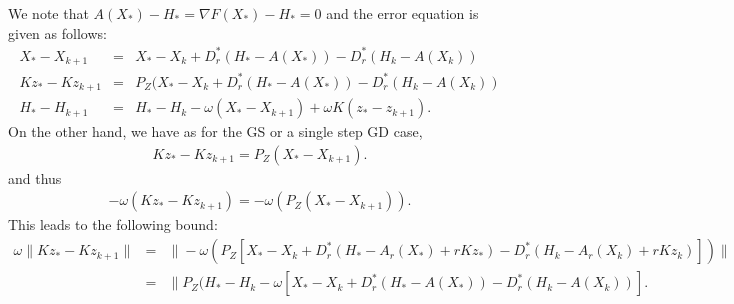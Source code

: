 \begin{itemize}
We note that $A(X_*) - H_* = \nabla F(X_*) - H_* = 0$ and the 
error equation is given as follows:  
\begin{eqnarray*}
X_{*} - X_{k+1} &=& X_* - X_{k} + D_r^*(H_* - A(X_*)) - D_r^* (H_k - A(X_k)) \\ 
Kz_* - Kz_{k+1} &=& P_Z (X_{*} - X_{k} + D_r^*(H_* - A(X_*)) - D_r^* (H_k - A(X_k)) \\ 
H_* - H_{k+1} &=& H_* - H_k - \omega (X_* - X_{k+1}) + \omega K(z_* - z_{k+1}). 
\end{eqnarray*}
On the other hand, we have as for the GS or a single step GD case,
\begin{eqnarray*}
Kz_{*} - Kz_{k+1} = P_Z \left ( X_* - X_{k+1} \right ). 
\end{eqnarray*}
and thus
\begin{eqnarray*}
-\omega \left ( Kz_{*} - Kz_{k+1} \right ) = -\omega \left ( P_Z \left ( X_* - X_{k+1} \right ) \right ). 
\end{eqnarray*}
This leads to the following bound:  
\begin{eqnarray*}
\omega \|Kz_{*} - Kz_{k+1}\| &=& \|-\omega \left ( P_Z [X_* - X_k + D_r^{*} (H_* - A_r(X_*) + rKz_*) - D_r^* (H_k - A_r(X_k) + rKz_k)] \right ) \| \\
&=& \|P_Z (H_* - H_k - \omega [X_* - X_k + D_r^* (H_* - A(X_*)) - D_r^* (H_k - A(X_k))].
%

\end{eqnarray*}
\end{itemize}
